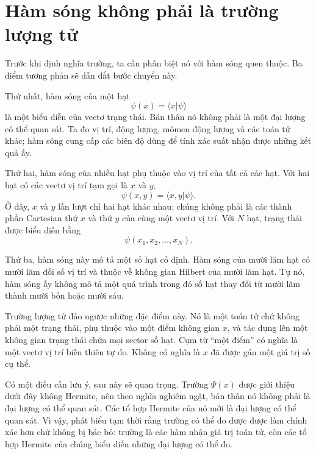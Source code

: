 \section{Hàm sóng không phải là trường lượng tử}

Trước khi định nghĩa trường, ta cần phân biệt nó với hàm sóng quen thuộc. Ba điểm tương phản sẽ dẫn dắt bước chuyển này.

Thứ nhất, hàm sóng của một hạt
\begin{equation}
\psi(x)=\langle x|\psi\rangle
\end{equation}
là một biểu diễn của vectơ trạng thái. Bản thân nó không phải là một đại lượng có thể quan sát. Ta đo vị trí, động lượng, mômen động lượng và các toán tử khác; hàm sóng cung cấp các biên độ dùng để tính xác suất nhận được những kết quả ấy.

Thứ hai, hàm sóng của nhiều hạt phụ thuộc vào vị trí của tất cả các hạt. Với hai hạt có các vectơ vị trí tạm gọi là \(x\) và \(y\),
\begin{equation}
\psi(x,y)=\langle x,y|\psi\rangle.
\end{equation}
Ở đây, \(x\) và \(y\) lần lượt chỉ hai hạt khác nhau; chúng không phải là các thành phần Cartesian thứ \(x\) và thứ \(y\) của cùng một vectơ vị trí. Với \(N\) hạt, trạng thái được biểu diễn bằng
\begin{equation}
\psi(x_1,x_2,\ldots,x_N).
\end{equation}

Thứ ba, hàm sóng này mô tả một số hạt cố định. Hàm sóng của mười lăm hạt có mười lăm đối số vị trí và thuộc về không gian Hilbert của mười lăm hạt. Tự nó, hàm sóng ấy không mô tả một quá trình trong đó số hạt thay đổi từ mười lăm thành mười bốn hoặc mười sáu.

Trường lượng tử đảo ngược những đặc điểm này. Nó là một toán tử chứ không phải một trạng thái, phụ thuộc vào một điểm không gian \(x\), và tác dụng lên một không gian trạng thái chứa mọi sector số hạt. Cụm từ ``một điểm'' có nghĩa là một vectơ vị trí biến thiên tự do. Không có nghĩa là \(x\) đã được gán một giá trị số cụ thể.

Có một điều cần lưu ý, sau này sẽ quan trọng. Trường \(\Psi(x)\) được giới thiệu dưới đây không Hermite, nên theo nghĩa nghiêm ngặt, bản thân nó không phải là đại lượng có thể quan sát. Các tổ hợp Hermite của nó mới là đại lượng có thể quan sát. Vì vậy, phát biểu tạm thời rằng trường có thể đo được được làm chính xác hơn chứ không bị bác bỏ: trường là các hàm nhận giá trị toán tử, còn các tổ hợp Hermite của chúng biểu diễn những đại lượng có thể đo.

